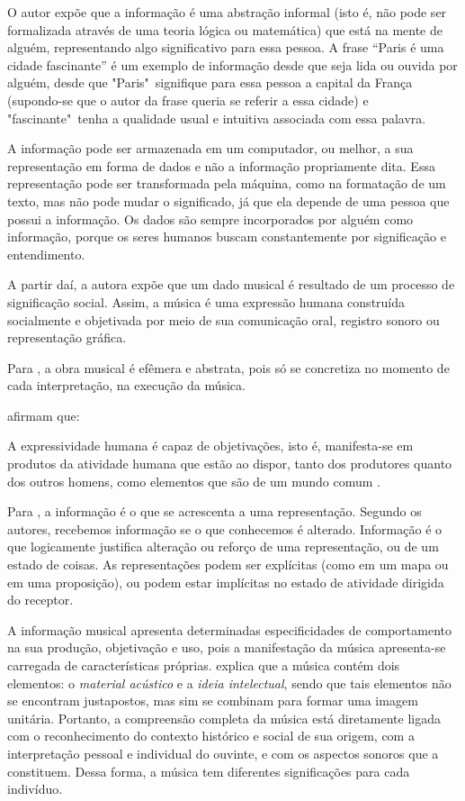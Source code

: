 O autor  expõe que a informação é uma abstração informal (isto é, não pode ser formalizada através de uma teoria lógica ou matemática) que está na mente de alguém, representando algo significativo para essa pessoa. A frase “Paris é uma cidade fascinante” é um exemplo de informação desde que seja lida ou ouvida por alguém, desde que "Paris"\ signifique para essa pessoa a capital da França (supondo-se que o autor da frase queria se referir a essa cidade) e "fascinante"\ tenha a qualidade usual e intuitiva associada com essa palavra.

A informação pode ser armazenada em um computador, ou melhor, a sua representação em forma de dados e não a informação propriamente dita. Essa representação pode ser transformada pela máquina, como na formatação de um texto, mas não pode mudar o significado, já que ela depende de uma pessoa que possui a informação. Os dados são sempre incorporados por alguém como informação, porque os seres humanos buscam constantemente por significação e entendimento.

A partir daí, a autora  expõe que um dado musical é resultado de um processo de significação social. Assim, a música é uma expressão humana construída socialmente e objetivada por meio de sua comunicação oral, registro sonoro ou representação gráfica.

Para , a obra musical é efêmera e abstrata, pois só se concretiza no momento de cada interpretação, na execução da música. 

 afirmam que:

\begin{citacao}
A expressividade humana é capaz de objetivações, isto é, manifesta-se em produtos da atividade humana que estão ao dispor, tanto dos produtores quanto dos outros homens, como elementos que são de um mundo comum \cite{berger&luckmann2014}.
\end{citacao}

Para , a informação é o que se acrescenta a uma representação. Segundo os autores, recebemos informação se o que conhecemos é alterado. Informação é o que logicamente justifica alteração ou reforço de uma representação, ou de um estado de coisas. As representações podem ser explícitas (como em um mapa ou em uma proposição), ou podem estar implícitas no estado de atividade dirigida do receptor.

A informação musical apresenta determinadas especificidades de comportamento na sua produção, objetivação e uso, pois a manifestação da música apresenta-se carregada de características próprias.  explica que a música contém dois elementos: o \textit{material acústico} e a \textit{ideia intelectual}, sendo que tais elementos não se encontram justapostos, mas sim se combinam para formar uma imagem unitária. Portanto, a compreensão completa da música está diretamente ligada com o reconhecimento do contexto histórico e social de sua origem, com a interpretação pessoal e individual do ouvinte, e com os aspectos sonoros que a constituem. Dessa forma, a música tem diferentes significações para cada indivíduo.


